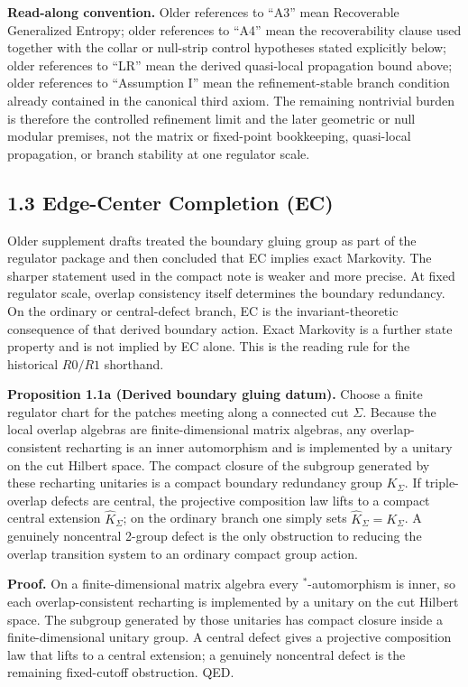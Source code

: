 \textbf{Read-along convention.} Older references to ``A3'' mean Recoverable Generalized Entropy; older references to ``A4'' mean the recoverability clause used together with the collar or null-strip control hypotheses stated explicitly below; older references to ``LR'' mean the derived quasi-local propagation bound above; older references to ``Assumption I'' mean the refinement-stable branch condition already contained in the canonical third axiom. The remaining nontrivial burden is therefore the controlled refinement limit and the later geometric or null modular premises, not the matrix or fixed-point bookkeeping, quasi-local propagation, or branch stability at one regulator scale.

\subsection{1.3 Edge-Center Completion (EC)}\label{13-edge-center-completion-ec}

Older supplement drafts treated the boundary gluing group as part of the regulator package and then concluded that EC implies exact Markovity. The sharper statement used in the compact note is weaker and more precise. At fixed regulator scale, overlap consistency itself determines the boundary redundancy. On the ordinary or central-defect branch, EC is the invariant-theoretic consequence of that derived boundary action. Exact Markovity is a further state property and is not implied by EC alone. This is the reading rule for the historical \(R0/R1\) shorthand.

\textbf{Proposition 1.1a (Derived boundary gluing datum).} Choose a finite regulator chart for the patches meeting along a connected cut \(\Sigma\). Because the local overlap algebras are finite-dimensional matrix algebras, any overlap-consistent recharting is an inner automorphism and is implemented by a unitary on the cut Hilbert space. The compact closure of the subgroup generated by these recharting unitaries is a compact boundary redundancy group \(K_\Sigma\). If triple-overlap defects are central, the projective composition law lifts to a compact central extension \(\widehat K_\Sigma\); on the ordinary branch one simply sets \(\widehat K_\Sigma = K_\Sigma\). A genuinely noncentral 2-group defect is the only obstruction to reducing the overlap transition system to an ordinary compact group action.

\textbf{Proof.} On a finite-dimensional matrix algebra every \(^*\)-automorphism is inner, so each overlap-consistent recharting is implemented by a unitary on the cut Hilbert space. The subgroup generated by those unitaries has compact closure inside a finite-dimensional unitary group. A central defect gives a projective composition law that lifts to a central extension; a genuinely noncentral defect is the remaining fixed-cutoff obstruction. QED.

